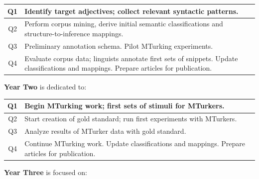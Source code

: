 \documentclass[10pt]{article}
\newcommand{\miniskip}{\vspace*{1mm}}
\begin{document}
\vspace{1mm}\noindent
{\small
\begin{tabularx}{470pt}{|c|X|}

\hline

Q1 & Identify target adjectives; collect relevant syntactic patterns. \\
\hline

Q2 & Perform corpus mining,  derive initial semantic classifications and structure-to-inference mappings. \\

\hline

Q3 & Preliminary annotation schema. Pilot MTurking experiments.  \\
 
\hline

Q4 & Evaluate corpus data; linguists annotate first sets of snippets.  Update classifications and mappings. Prepare articles for publication.   \\

\hline

\end{tabularx}
}

\miniskip\noindent
{\bf Year Two} is dedicated to: 

\vspace{1mm}\noindent
{\small
\begin{tabularx}{470pt}{|c|X|}

\hline

Q1 	&  Begin MTurking work; first sets of stimuli for MTurkers. \\

\hline

Q2	& Start creation of gold standard; run first experiments with MTurkers. \\

\hline

Q3	&  Analyze results of MTurker data with gold standard.\\

\hline

Q4	& Continue MTurking work. Update classifications and mappings. Prepare articles for publication. \\
\hline

\end{tabularx}
}

\miniskip\noindent
{\bf Year Three} is focused on:  
\end{document}
